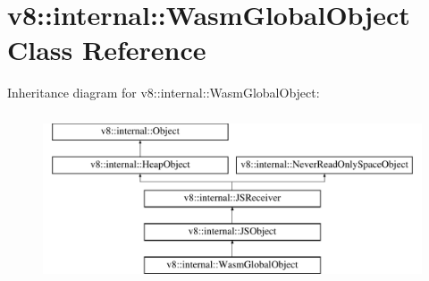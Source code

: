\hypertarget{classv8_1_1internal_1_1WasmGlobalObject}{}\section{v8\+:\+:internal\+:\+:Wasm\+Global\+Object Class Reference}
\label{classv8_1_1internal_1_1WasmGlobalObject}
Inheritance diagram for v8\+:\+:internal\+:\+:Wasm\+Global\+Object\+:\begin{figure}[H]
\begin{center}
\leavevmode
\includegraphics[height=5.000000cm]{classv8_1_1internal_1_1WasmGlobalObject}
\end{center}
\end{figure}
